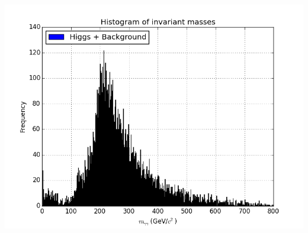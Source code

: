 \documentclass[11pt]{amsart}
\newenvironment{Figure}
  {\par\medskip\noindent\minipage{\linewidth}}
  {\endminipage\par\medskip}
\begin{document}
\begin{multicols}{2}
\begin{Figure}
  \centering
  \includegraphics[width=\linewidth]{invmass}
  \label{fig:invmass}
\end{Figure}

\end{multicols}



\end{document}

